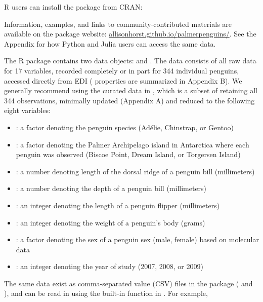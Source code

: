 R users can install the  package from CRAN:

Information, examples, and links to community-contributed materials are
available on the  package website:
\href{https://allisonhorst.github.io/palmerpenguins/}{allisonhorst.github.io/palmerpenguins/}.
See the Appendix for how Python and Julia users can access the same
data.

The  R package contains two data objects:
 and . The  data
consists of all raw data for 17 variables, recorded completely or in
part for 344 individual penguins, accessed directly from EDI
( properties are summarized in Appendix B). We
generally recommend using the curated data in , which is
a subset of  retaining all 344 observations,
minimally updated (Appendix A) and reduced to the following eight
variables:

\begin{itemize}
\tightlist
\item
  : a factor denoting the penguin species (Adélie,
  Chinstrap, or Gentoo)
\item
  : a factor denoting the Palmer Archipelago island in
  Antarctica where each penguin was observed (Biscoe Point, Dream
  Island, or Torgersen Island)
\item
  : a number denoting length of the dorsal ridge
  of a penguin bill (millimeters)
\item
  : a number denoting the depth of a penguin bill
  (millimeters)
\item
  : an integer denoting the length of a
  penguin flipper (millimeters)
\item
  : an integer denoting the weight of a penguin's
  body (grams)
\item
  : a factor denoting the sex of a penguin sex (male, female)
  based on molecular data
\item
  : an integer denoting the year of study (2007, 2008, or
  2009)
\end{itemize}

The same data exist as comma-separated value (CSV) files in the package
( and ), and can be read in
using the built-in  function in
. For example,

